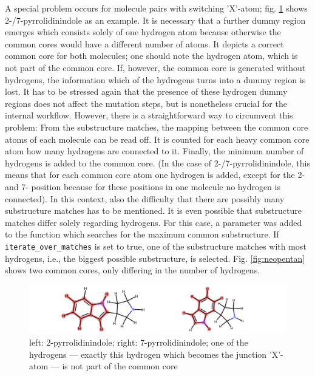 A special problem occurs for molecule pairs with switching 'X'-atom; fig. \ref{fig:pyrrolidinindole} shows 2-/7-pyrrolidinindole as an example. It is necessary that a further dummy region emerges which consists solely of one hydrogen atom because otherwise the common cores would have a different number of atoms. It depicts a correct common core for both molecules; one should note the hydrogen atom, which is not part of the common core. If, however, the common core is generated without hydrogens, the information which of the hydrogens turns into a dummy region is lost.
It has to be stressed again that the presence of these hydrogen dummy regions does not affect the mutation steps, but is nonetheless crucial for the internal {\trafo} workflow. However, there is a straightforward way to circumvent this problem: From the substructure matches, the mapping between the common core atoms of each molecule can be read off. It is counted for each heavy common core atom how many hydrogens are connected to it. Finally, the minimum number of hydrogens is added to the common core. (In the case of 2-/7-pyrrolidinindole, this means that for each common core atom one hydrogen is added, except for the 2- and 7- position because for these positions in one molecule no hydrogen is connected).
In this context, also the difficulty that there are possibly many substructure matches has to be mentioned.
It is even possible that substructure matches differ solely regarding hydrogens. For this case, a parameter was added to the function which searches for the maximum common substructure. If \texttt{iterate\_over\_matches} is set to true, one of the substructure matches with most hydrogens, i.e., the biggest possible substructure, is selected. Fig. \ref{fig:neopentan} shows two common cores, only differing in the number of hydrogens.



\begin{figure}
	\includegraphics[scale=0.8]{pyrrolidinindole}
	
	\caption{
		left: 2-pyrrolidinindole; right: 7-pyrrolidinindole; 
		one of the hydrogens --- exactly this hydrogen which becomes the junction 'X'-atom --- is not part of the common core}
	\label{fig:pyrrolidinindole}
\end{figure}



